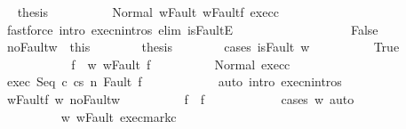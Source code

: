 \begin{isabellebody}
\ \isamarkupfalse%
\ {\isacharquery}thesis\isanewline
\ \ \ \ \ \ \ \ \isamarkupfalse%
\ Normal\ w{\isacharunderscore}Fault\ w{\isacharprime}{\isacharunderscore}Fault{\isacharunderscore}f\ exec{\isacharunderscore}c{}\isanewline
\ \ \ \ \ \ \ \ \isamarkupfalse%
\ {\isacharparenleft}fastforce\ intro{\isacharcolon}\ execn{\isachardot}intros\ elim{\isacharcolon}\ isFaultE{\isacharparenright}\ \ \ \ \ \ \isanewline
\ \ \ \ \isamarkupfalse%
\isanewline
\ \ \ \ \ \ \isamarkupfalse%
\ False\isanewline
\ \ \ \ \ \ \isamarkupfalse%
\ noFault{\isacharunderscore}w\ {\isacharequal}\ this\isanewline
\ \ \ \ \ \ \isamarkupfalse%
\ {\isacharquery}thesis\isanewline
\ \ \ \ \ \ \isamarkupfalse%
\ {\isacharparenleft}cases\ {\isachardoublequoteopen}isFault\ w{\isacharprime}{\isachardoublequoteclose}{\isacharparenright}\isanewline
\ \ \ \ \ \ \ \ \isamarkupfalse%
\ True\isanewline
\ \ \ \ \ \ \ \ \isamarkupfalse%
\ \isamarkupfalse%
\ f{\isacharprime}\ \ w{\isacharprime}{\isacharcolon}\ {\isachardoublequoteopen}w{\isacharprime}{\isacharequal}Fault\ f{\isacharprime}{\isachardoublequoteclose}\isacommand{{\isachardot}{\isachardot}}\isamarkupfalse%
\isanewline
\ \ \ \ \ \ \ \ \isamarkupfalse%
\ Normal\ exec{\isacharunderscore}c{}\ \isanewline
\ \ \ \ \ \ \ \ \isamarkupfalse%
\ exec{\isacharcolon}\ {\isachardoublequoteopen}{\isasymGamma}{\isasymturnstile}{\isasymlangle}Seq\ c{}\ c{}{\isacharcomma}s{\isasymrangle}\ {\isacharequal}n{\isasymRightarrow}\ Fault\ f{\isacharprime}{\isachardoublequoteclose}\isanewline
\ \ \ \ \ \ \ \ \ \ \isamarkupfalse%
\ {\isacharparenleft}auto\ intro{\isacharcolon}\ execn{\isachardot}intros{\isacharparenright}\isanewline
\ \ \ \ \ \ \ \ \isamarkupfalse%
\ w{\isacharprime}{\isacharunderscore}Fault{\isacharunderscore}f\ w{\isacharprime}\ noFault{\isacharunderscore}w\isanewline
\ \ \ \ \ \ \ \ \isamarkupfalse%
\ {\isachardoublequoteopen}f{\isacharprime}\ {\isasymnoteq}\ f{\isachardoublequoteclose}\isanewline
\ \ \ \ \ \ \ \ \ \ \isamarkupfalse%
\ {\isacharparenleft}cases\ w{\isacharparenright}\ auto\isanewline
\ \ \ \ \ \ \ \ \isamarkupfalse%
\isanewline
\ \ \ \ \ \ \ \ \isamarkupfalse%
\ w{\isacharprime}\ w{\isacharprime}{\isacharunderscore}Fault\ exec{\isacharunderscore}mark{\isacharunderscore}c{}\ \isamarkupfalse%

\end{isabellebody}
